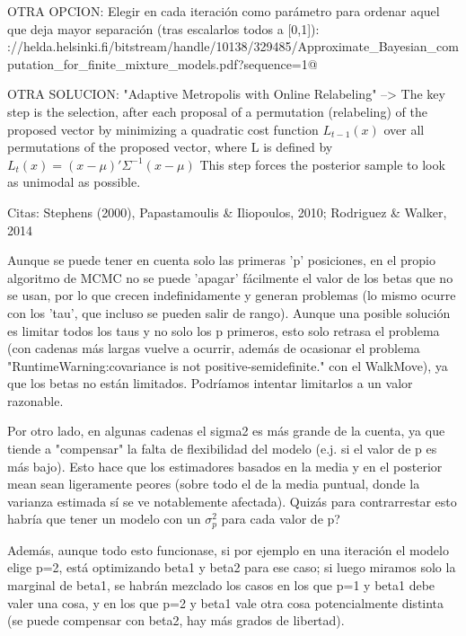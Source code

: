 \begin{outcomment}
OTRA OPCION: Elegir en cada iteración como parámetro para ordenar aquel que deja mayor separación (tras escalarlos todos a [0,1]): \verb@https://helda.helsinki.fi/bitstream/handle/10138/329485/Approximate_Bayesian_computation_for_finite_mixture_models.pdf?sequence=1@

OTRA SOLUCION: "Adaptive Metropolis with Online Relabeling" --> The key step is the selection, after each proposal of a permutation (relabeling) of the proposed vector by minimizing a quadratic cost function
$L_{t-1} (x)$ over all permutations of the proposed vector, where L is defined by
$L_t(x) = (x - \mu)'\Sigma^{-1}(x - \mu)$
This step forces the posterior sample to look as unimodal as possible.

Citas: Stephens (2000), Papastamoulis \& Iliopoulos, 2010; Rodriguez \& Walker, 2014
\end{outcomment}

Aunque se puede tener en cuenta solo las primeras 'p' posiciones, en el propio algoritmo de MCMC no se puede 'apagar' fácilmente el valor de los betas que no se usan, por lo que crecen indefinidamente y generan problemas (lo mismo ocurre con los 'tau', que incluso se pueden salir de rango). Aunque una posible solución es limitar todos los taus y no solo los p primeros, esto solo retrasa el problema (con cadenas más largas vuelve a ocurrir, además de ocasionar el problema "RuntimeWarning:covariance is not positive-semidefinite." con el WalkMove), ya que los betas no están limitados. Podríamos intentar limitarlos a un valor razonable.

Por otro lado, en algunas cadenas el sigma2 es más grande de la cuenta, ya que tiende a "compensar" la falta de flexibilidad del modelo (e.j. si el valor de p es más bajo). Esto hace que los estimadores basados en la media y en el posterior mean sean ligeramente peores (sobre todo el de la media puntual, donde la varianza estimada sí se ve notablemente afectada). Quizás para contrarrestar esto habría que tener un modelo con un $\sigma^2_p$ para cada valor de p?

Además, aunque todo esto funcionase, si por ejemplo en una iteración el modelo elige p=2, está optimizando beta1 y beta2 para ese caso; si luego miramos solo la marginal de beta1, se habrán mezclado los casos en los que p=1 y beta1 debe valer una cosa, y en los que p=2 y beta1 vale otra cosa potencialmente distinta (se puede compensar con beta2, hay más grados de libertad).

